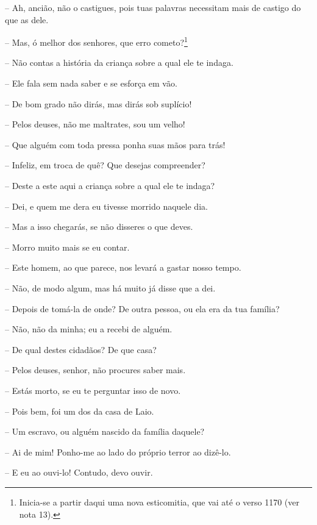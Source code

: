  --   Ah, ancião, não o castigues, pois tuas palavras necessitam mais de
castigo do que as dele.

 --   Mas, ó melhor dos senhores, que erro cometo?\footnote{Inicia-se a partir daqui uma nova esticomitia,
  que vai até o verso 1170 (ver nota 13).}

 --    Não contas a história da criança sobre a qual ele te indaga.

 --   Ele fala sem nada saber e se esforça em vão.

 --   De bom grado não dirás, mas dirás sob suplício!

 --   Pelos deuses, não me maltrates, sou um velho!

 --   Que alguém com toda pressa ponha suas mãos para trás!

 --   Infeliz, em troca de quê? Que desejas compreender?

 --   Deste a este aqui a criança sobre a qual ele te indaga?

 --   Dei, e quem me dera eu tivesse morrido naquele dia.

 --   Mas a isso chegarás, se não disseres o que deves.

 --   Morro muito mais se eu contar.

 --    Este homem, ao que parece, nos levará a gastar nosso tempo.

 --   Não, de modo algum, mas há muito já disse que a dei.

 --   Depois de tomá-la de onde? De outra pessoa, ou ela era da tua família?

 --   Não, não da minha; eu a recebi de alguém.

 --   De qual destes cidadãos? De que casa?

 --   Pelos deuses, senhor, não procures saber mais.

 --   Estás morto, se eu te perguntar isso de novo.

 --   Pois bem, foi um dos da casa de Laio.

 --   Um escravo, ou alguém nascido da família daquele?

 --   Ai de mim! Ponho-me ao lado do próprio terror ao dizê-lo.

 --    E eu ao ouvi-lo! Contudo, devo ouvir.

